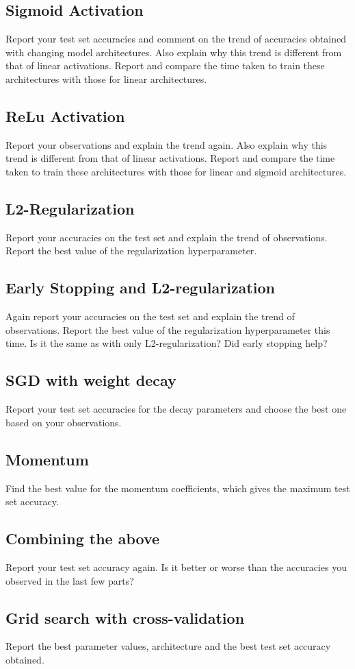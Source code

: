 \documentclass[a4paper,doc,notimes]{article}
\begin{document}
\subsection{Sigmoid Activation}
Report your test set accuracies and comment on the trend of accuracies obtained with changing model architectures. Also explain why this trend is different from that of linear activations. Report and compare the time taken to train these architectures with those for linear architectures.

\subsection{ReLu Activation}
Report your observations and explain the trend again. Also explain why this trend is different from that of linear activations. Report and compare the time taken to train these architectures with those for linear and sigmoid architectures.

\subsection{L2-Regularization}
Report your accuracies on the test set and explain the trend of observations. Report the best value of the regularization hyperparameter.

\subsection{Early Stopping and L2-regularization}
Again report your accuracies on the test set and explain the trend of observations. Report the best value of the regularization hyperparameter this time. Is it the same as with only L2-regularization? Did early stopping help?

\subsection{ SGD with weight decay}
Report your test set accuracies for the decay parameters and choose the best one based on your observations.

\subsection{Momentum}
Find the best value for the momentum coefficients, which gives the maximum test set accuracy.

\subsection{Combining the above}
Report your test set accuracy again. Is it better or worse than the accuracies you observed in the last few parts?

\subsection{Grid search with cross-validation}
Report the best parameter values, architecture and the best test set accuracy obtained.
\end{document}
